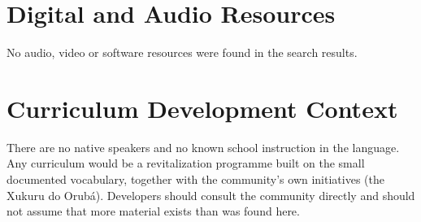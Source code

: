 \documentclass[12pt]{article}
\begin{document}
\section{Digital and Audio Resources}
No audio, video or software resources were found in the search results.

\section{Curriculum Development Context}
There are no native speakers and no known school instruction in the language. Any curriculum would be a revitalization programme built on the small documented vocabulary, together with the community's own initiatives (the Xukuru do Orub\'a). Developers should consult the community directly and should not assume that more material exists than was found here.
\end{document}
